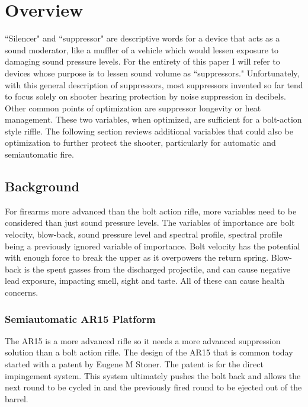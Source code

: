 \chapter{Overview}


``Silencer" and ``suppressor" are descriptive words for a device that acts as a sound moderator, like a muffler of a vehicle which would lessen exposure to damaging sound pressure levels. For the entirety of this paper I will refer to devices whose purpose is to lessen sound volume as ``suppressors." Unfortunately, with this general description of suppressors, most suppressors invented so far tend to focus solely on shooter hearing protection by noise suppression in decibels. Other common points of optimization are suppressor longevity or heat management. These two variables, when optimized, are sufficient for a bolt-action style riffle. The following section reviews additional variables that could also be optimization to further protect the shooter, particularly for automatic and semiautomatic fire.\cite{bull2004}





\section{Background}

For firearms more advanced than the bolt action rifle, more variables need to be considered than just sound pressure levels. The variables of importance are bolt velocity, blow-back, sound pressure level and spectral profile, spectral profile being a previously ignored variable of importance. Bolt velocity has the potential with enough force to break the upper as it overpowers the return spring. Blow-back is the spent gasses from the discharged projectile, and can cause negative lead exposure, impacting smell, sight and taste. All of these can cause health concerns.






\subsection{Semiautomatic AR15 Platform}

The AR15 is a more advanced rifle so it needs a more advanced suppression solution than a bolt action rifle. The design of the AR15 that is common today started with a patent by Eugene M Stoner. The patent is for the direct impingement system. This system ultimately pushes the bolt back and allows the next round to be cycled in and the previously fired round to be ejected out of the barrel.\cite{waybackit2010}








